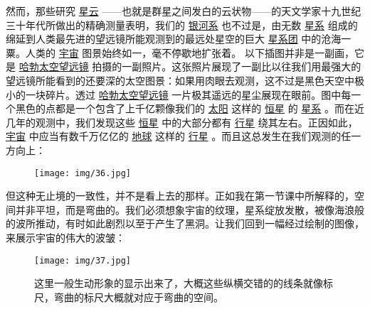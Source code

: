     然而，那些研究
\href{http://toyhouse.cc/wiki/index.php/星云}{星云}
——也就是群星之间发白的云状物——的天文学家十九世纪三十年代所做出的精确测量表明，我们的
\href{http://toyhouse.cc/wiki/index.php/银河系}{银河系}
也不过是，由无数
\href{http://toyhouse.cc/wiki/index.php/星系}{星系}
组成的绵延到人类最先进的望远镜所能观测到的最远处星空的巨大
\href{http://toyhouse.cc/wiki/index.php/星系团}{星系团}
中的沧海一粟。人类的
\href{http://toyhouse.cc/wiki/index.php/宇宙}{宇宙}
图景始终如一，毫不停歇地扩张着。
    以下插图并非是一副画，它是
\href{http://toyhouse.cc/wiki/index.php/哈勃太空望远镜}{哈勃太空望远镜}
拍摄的一副照片。这张照片展现了一副比以往我们用最强大的望远镜所能看到的还要深的太空图景：如果用肉眼去观测，这不过是黑色天空中极小的一块碎片。透过
\href{http://toyhouse.cc/wiki/index.php/哈勃太空望远镜}{哈勃太空望远镜}
一片极其遥远的星尘展现在眼前。图中每一个黑色的点都是一个包含了上千亿颗像我们的
\href{http://toyhouse.cc/wiki/index.php/太阳}{太阳}
这样的
\href{http://toyhouse.cc/wiki/index.php/恒星}{恒星}
的
\href{http://toyhouse.cc/wiki/index.php/星系}{星系}
。而在近几年的观测中，我们发现这些
\href{http://toyhouse.cc/wiki/index.php/恒星}{恒星}
中的大部分都有
\href{http://toyhouse.cc/wiki/index.php/行星}{行星}
绕其左右。正因如此，
\href{http://toyhouse.cc/wiki/index.php/宇宙}{宇宙}
中应当有数千万亿亿的
\href{http://toyhouse.cc/wiki/index.php/地球}{地球}
这样的
\href{http://toyhouse.cc/wiki/index.php/行星}{行星}
。而且这总发生在我们观测的任一方向上：

\begin{figure}[htbp]
\begin{minipage}[t]{0.3\linewidth}
\centering
\bc
\texttt{[image: img/36.jpg]}\\[12pt]
\ec
\caption{}
\label{fig:side:a}
\end{minipage}

\end{figure}  

    但这种无止境的一致性，并不是看上去的那样。正如我在第一节课中所解释的，空间并非平坦，而是弯曲的。我们必须想象宇宙的纹理，星系绽放发散，被像海浪般的波所推动，有时如此剧烈以至于产生了黑洞。让我们回到一幅经过绘制的图像，来展示宇宙的伟大的波皱：
\begin{figure}[htbp]
\begin{minipage}[t]{0.3\linewidth}
\centering
\bc
\texttt{[image: img/37.jpg]}\\[12pt]
\ec
\caption{这里一般生动形象的显示出来了，大概这些纵横交错的的线条就像标尺，弯曲的标尺大概就对应于弯曲的空间。}
\label{fig:side:a}
\end{minipage}

\end{figure}  

